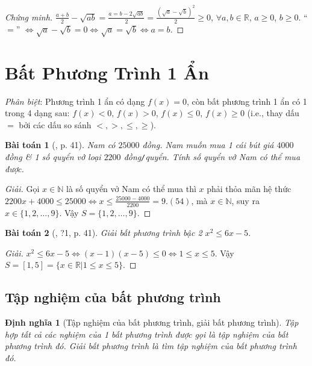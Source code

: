\documentclass{article}
\newtheorem{baitoan}{Bài toán}
\newtheorem{dinhnghia}{Định nghĩa}
\begin{document}
\begin{proof}[Chứng minh]
	$\frac{a + b}{2} - \sqrt{ab} = \frac{a = b - 2\sqrt{ab}}{2} = \frac{(\sqrt{a} - \sqrt{b})^2}{2}\ge0$, $\forall a,b\in\mathbb{R}$, $a\ge0$, $b\ge0$. ``$=$'' $\Leftrightarrow\sqrt{a} - \sqrt{b} = 0\Leftrightarrow\sqrt{a} = \sqrt{b}\Leftrightarrow a = b$.
\end{proof}


\section{Bất Phương Trình 1 Ẩn}
\textit{Phân biệt}: Phương trình 1 ẩn có dạng $f(x) = 0$, còn bất phương trình 1 ẩn có 1 trong 4 dạng sau: $f(x) < 0$, $f(x) > 0$, $f(x)\le0$, $f(x)\ge 0$ (i.e., thay dấu $=$ bởi các dấu so sánh $<,>,\le,\ge$).

\begin{baitoan}[\cite{SGK_Toan_8_tap_2}, p. 41]
	Nam có $25000$ đồng. Nam muốn mua 1 cái bút giá $4000$ đồng \& 1 số quyển vở loại $2200$ đồng\emph{\texttt{/}}quyển. Tính số quyển vở Nam có thể mua được.
\end{baitoan}

\begin{proof}[Giải]
	Gọi $x\in\mathbb{N}$ là số quyển vở Nam có thể mua thì $x$ phải thỏa mãn hệ thức $2200x + 4000\le25000\Leftrightarrow x\le\frac{25000 - 4000}{2200} = 9.(54)$, mà $x\in\mathbb{N}$, suy ra $x\in\{1,2,\ldots,9\}$. Vậy $S = \{1,2,\ldots,9\}$.
\end{proof}

\begin{baitoan}[\cite{SGK_Toan_8_tap_2}, ?1, p. 41]
	Giải bất phương trình bậc 2 $x^2\le6x - 5$.
\end{baitoan}

\begin{proof}[Giải]
	$x^2\le6x - 5\Leftrightarrow(x - 1)(x - 5)\le0\Leftrightarrow1\le x\le 5$. Vậy $S = [1,5] = \{x\in\mathbb{R}|1\le x\le5\}$.
\end{proof}

\subsection{Tập nghiệm của bất phương trình}

\begin{dinhnghia}[Tập nghiệm của bất phương trình, giải bất phương trình]
	Tập hợp tất cả các nghiệm của 1 bất phương trình được gọi là \emph{tập nghiệm} của bất phương trình đó. \emph{Giải bất phương trình} là tìm tập nghiệm của bất phương trình đó.
\end{dinhnghia}
\end{document}
